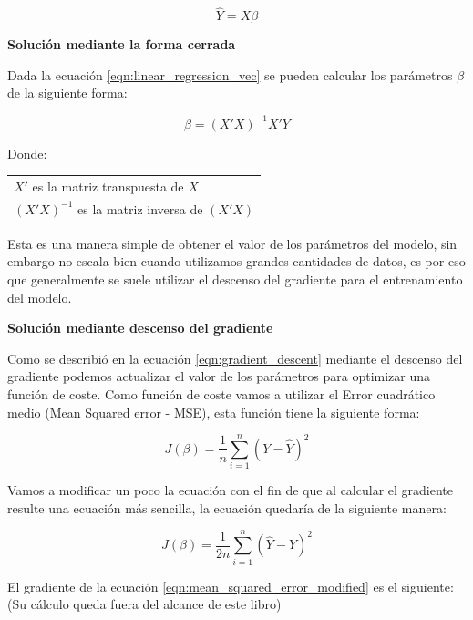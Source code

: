 \documentclass[11pt,fleqn]{book} %
\begin{document}
\begin{equation}
\label{eqn:linear_regression_vec}
\hat{Y}  = X \beta
\end{equation}

\clearpage

\textbf{Solución mediante la forma cerrada}

Dada la ecuación \ref{eqn:linear_regression_vec} se pueden calcular los parámetros $\beta$ de la siguiente forma:

\begin{equation}
\label{eqn:linear_regression_closed_form_solution}
\beta = (X' X)^{-1}X'Y
\end{equation}

Donde:

\begin{tabular}{l}
	$X'$ es la matriz transpuesta de $X$\\
	$(X' X)^{-1}$ es la matriz inversa de $(X' X)$\\
\end{tabular}

Esta es una manera simple de obtener el valor de los parámetros del modelo, sin embargo no escala bien cuando utilizamos grandes cantidades de datos, es por eso que generalmente se suele utilizar el descenso del gradiente para el entrenamiento del modelo.

\textbf{Solución mediante descenso del gradiente}

Como se describió en la ecuación \ref{eqn:gradient_descent} mediante el descenso del gradiente podemos actualizar el valor de los parámetros para optimizar una función de coste.  Como función de coste vamos a utilizar el Error cuadrático medio (Mean Squared error - MSE), esta función tiene la siguiente forma:

\begin{equation}
\label{eqn:mean_squared_error}
J(\beta)=\frac{1}{n} \sum_{i=1}^{n}\left (Y - \hat{Y}  \right )^{2}
\end{equation}

Vamos a modificar un poco la ecuación con el fin de que al calcular el gradiente resulte una ecuación más sencilla, la ecuación quedaría de la siguiente manera:

\begin{equation}
\label{eqn:mean_squared_error_modified}
J(\beta)=\frac{1}{2n} \sum_{i=1}^{n}\left (\hat{Y} - Y  \right )^{2}
\end{equation}

El gradiente de la ecuación \ref{eqn:mean_squared_error_modified} es el siguiente: (Su cálculo queda fuera del alcance de este libro)
\end{document}
